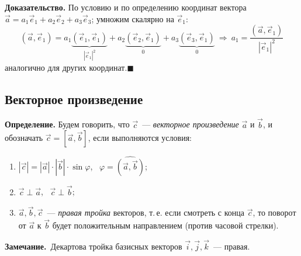 \documentclass[a4paper,11pt]{article}
\newcommand{\zam}{\textbf{Замечание.}\ }
\newcommand{\qedr}{\hfill$\blacksquare$}
\begin{document}
\textbf{Доказательство.} По условию и по определению координат вектора
$\vec a=a_1\vec e_1+a_2\vec e_2+a_3\vec e_3$; умножим скалярно на $\vec e_1$:
\[
(\vec a,\vec e_1)=a_1\underbrace{(\vec e_1,\vec e_1)}_{|\vec e_1|^2}+a_2\underbrace{(\vec e_2,\vec e_1)}_{0}+a_3\underbrace{(\vec e_3,\vec e_1)}_{0}
\ \Rightarrow\ a_1=\frac{(\vec a,\vec e_1)}{|\vec e_1|^2}
\]
аналогично
для других координат.\qedr

\subsection{Векторное произведение}
\begin{opr}
\textbf{Определение.} Будем говорить, что $\vec c$~--- \emph{векторное произведение} $\vec a$ и $\vec b$, и
обозначать $\vec c=[\vec a,\vec b]$, если выполняются условия:
\begin{enumerate}[label=\arabic*)]
\item $|\vec c|=|\vec a|\cdot|\vec b|\cdot\sin\varphi$, \ $\varphi=\widehat{(\vec a,\vec b)}$;
\item $\vec c\perp\vec a$, \ $\vec c\perp\vec b$;
\item $\vec a,\vec b,\vec c$~--- \emph{правая тройка} векторов, т.\,е. если смотреть с конца $\vec c$, то поворот от
$\vec a$ к $\vec b$ будет положительным направлением (против часовой стрелки).
\end{enumerate}
\end{opr}
\begin{center}
\end{center}
\zam Декартова тройка базисных векторов $\vec i,\vec j,\vec k$~--- правая.
\end{document}
